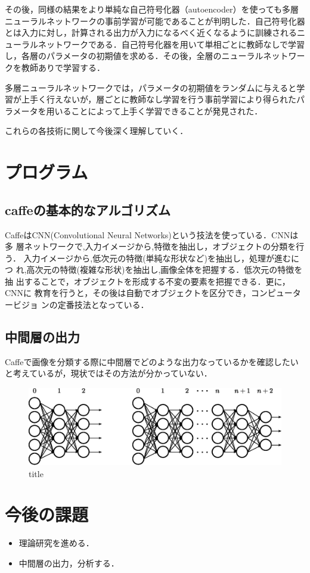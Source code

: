 \documentclass[a4paper,10pt]{jsarticle}
\begin{document}
その後，同様の結果をより単純な自己符号化器（autoencoder）を使っても多層ニューラルネットワークの事前学習が可能であることが判明した．自己符号化器とは入力に対し，計算される出力が入力になるべく近くなるように訓練されるニューラルネットワークである．自己符号化器を用いて単相ごとに教師なしで学習し，各層のパラメータの初期値を求める．その後，全層のニューラルネットワークを教師ありで学習する．

多層ニューラルネットワークでは，パラメータの初期値をランダムに与えると学習が上手く行えないが，層ごとに教師なし学習を行う事前学習により得られたパラメータを用いることによって上手く学習できることが発見された．

これらの各技術に関して今後深く理解していく．
\section{プログラム}

\subsection{caffeの基本的なアルゴリズム}
CaffeはCNN(Convolutional Neural Networks)という技法を使っている．CNNは多
層ネットワークで,入力イメージから,特徴を抽出し，オブジェクトの分類を行う．
入力イメージから,低次元の特徴(単純な形状など)を抽出し，処理が進むにつ
れ,高次元の特徴(複雑な形状)を抽出し,画像全体を把握する．低次元の特徴を抽
出することで，オブジェクトを形成する不変の要素を把握できる．更に，CNNに
教育を行うと，その後は自動でオブジェクトを区分でき，コンピュータービジョ
ンの定番技法となっている．

\subsection{中間層の出力}
Caffeで画像を分類する際に中間層でどのような出力なっているかを確認したいと考えているが，現状ではその方法が分かっていない．

\begin{figure}[tb]
  \begin{center}
    \includegraphics[clip,width=12cm]{./fig/eps/Deep_Learning_concept.eps}
  \end{center}
  \caption{title}
  \label{fig:title}
\end{figure}

\section{今後の課題}
\begin{itemize}
 \item 理論研究を進める．
 \item 中間層の出力，分析する．
\end{itemize}
\end{document}
